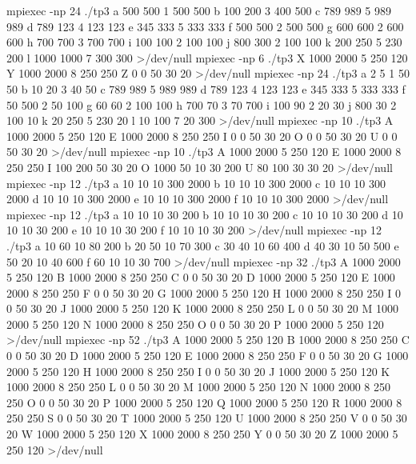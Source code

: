 \li mpiexec -np 24 ./tp3  a 500 500 1 500 500 b 100 200 3 400 500 c 789 989 5 989 989 d 789 123 4 123 123 e 345 333 5 333 333 f 500 500 2 500 500 g 600 600 2 600 600 h 700 700 3 700 700 i 100 100 2 100 100 j 800 300 2 100 100 k 200 250 5 230 200 l 1000 1000 7 300 300 >/dev/null
\li mpiexec -np 6 ./tp3  X 1000 2000 5 250 120 Y 1000 2000 8 250 250 Z 0 0 50 30 20 >/dev/null
\li mpiexec -np 24 ./tp3  a 2 5 1 50 50 b 10 20 3 40 50 c 789 989 5 989 989 d 789 123 4 123 123 e 345 333 5 333 333 f 50 500 2 50 100 g 60 60 2 100 100 h 700 70 3 70 700 i 100 90 2 20 30 j 800 30 2 100 10 k 20 250 5 230 20 l 10 100 7 20 300 >/dev/null
\li mpiexec -np 10 ./tp3  A 1000 2000 5 250 120 E 1000 2000 8 250 250 I 0 0 50 30 20 O 0 0 50 30 20 U 0 0 50 30 20 >/dev/null
\li mpiexec -np 10 ./tp3  A 1000 2000 5 250 120 E 1000 2000 8 250 250 I 100 200 50 30 20 O 1000 50 10 30 200 U 80 100 30 30 20 >/dev/null
\li mpiexec -np 12 ./tp3  a 10 10 10 300 2000 b 10 10 10 300 2000 c 10 10 10 300 2000 d 10 10 10 300 2000 e 10 10 10 300 2000 f 10 10 10 300 2000 >/dev/null
\li mpiexec -np 12 ./tp3  a 10 10 10 30 200 b 10 10 10 30 200 c 10 10 10 30 200 d 10 10 10 30 200 e 10 10 10 30 200 f 10 10 10 30 200 >/dev/null
\li mpiexec -np 12 ./tp3  a 10 60 10 80 200 b 20 50 10 70 300 c 30 40 10 60 400 d 40 30 10 50 500 e 50 20 10 40 600 f 60 10 10 30 700 >/dev/null
\li mpiexec -np 32 ./tp3  A 1000 2000 5 250 120 B 1000 2000 8 250 250 C 0 0 50 30 20 D 1000 2000 5 250 120 E 1000 2000 8 250 250 F 0 0 50 30 20 G 1000 2000 5 250 120 H 1000 2000 8 250 250 I 0 0 50 30 20 J 1000 2000 5 250 120 K 1000 2000 8 250 250 L 0 0 50 30 20 M 1000 2000 5 250 120 N 1000 2000 8 250 250 O 0 0 50 30 20 P 1000 2000 5 250 120 >/dev/null
\li mpiexec -np 52 ./tp3  A 1000 2000 5 250 120 B 1000 2000 8 250 250 C 0 0 50 30 20 D 1000 2000 5 250 120 E 1000 2000 8 250 250 F 0 0 50 30 20 G 1000 2000 5 250 120 H 1000 2000 8 250 250 I 0 0 50 30 20 J 1000 2000 5 250 120 K 1000 2000 8 250 250 L 0 0 50 30 20 M 1000 2000 5 250 120 N 1000 2000 8 250 250 O 0 0 50 30 20 P 1000 2000 5 250 120 Q 1000 2000 5 250 120 R 1000 2000 8 250 250 S 0 0 50 30 20 T 1000 2000 5 250 120 U 1000 2000 8 250 250 V 0 0 50 30 20 W 1000 2000 5 250 120 X 1000 2000 8 250 250 Y 0 0 50 30 20 Z 1000 2000 5 250 120 >/dev/null
